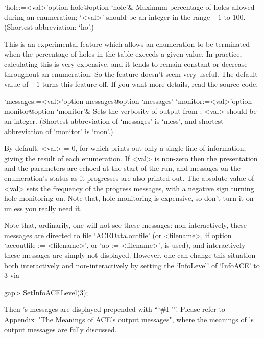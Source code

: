 \>`hole:=<val>'{option hole}@{option `hole'}&
Maximum percentage of holes allowed during an enumeration;
`<val>' should be an integer in the range $-1$ to 100.
(Shortest abbreviation: `ho'.)

This is an experimental feature which  allows  an  enumeration  to  be
terminated when the percentage of holes in the table exceeds  a  given
value. In practice, calculating this is very expensive, and  it  tends
to remain constant or  decrease  throughout  an  enumeration.  So  the
feature doesn't seem very useful. The default value of $-1$ turns this
feature off. If you want more details, read the source code.

\enditems


\beginitems

\>`messages:=<val>'{option messages}@{option `messages'}
\>`monitor:=<val>'{option monitor}@{option `monitor'}&
Sets the verbosity of output from {\ACE}; <val> should be an integer.
(Shortest  abbreviation  of  `messages'  is   `mess',   and   shortest
abbreviation of `monitor' is `mon'.)

By default, <val> = 0, for which {\ACE} prints out only a single  line
of information, giving the result of each  enumeration.  If  <val>  is
non-zero then the presentation and the parameters are  echoed  at  the
start of the run, and messages  on  the  enumeration's  status  as  it
progresses are also printed out. The absolute value of <val> sets  the
frequency of the progress messages, with a negative sign turning  hole
monitoring on. Note that, hole monitoring is expensive, so don't  turn
it on unless you really need it.

Note   that,  ordinarily,  one   will   not   see   these    messages:
non-interactively,   these   messages    are    directed    to    file
`ACEData.outfile'   (or   <filename>,   if   option   `aceoutfile   :=
<filename>', or `ao := <filename>', is used), and interactively  these
messages are simply  not  displayed.  However,  one  can  change  this
situation both interactively and   non-interactively  by  setting  the
`InfoLevel' of `InfoACE' to 3 via

\beginexample
gap> SetInfoACELevel(3);
\endexample

Then {\ACE}'s messages are  displayed  prepended  with  ```\#I  '''.
Please refer to Appendix~"The  Meanings  of  ACE's  output  messages",
where the meanings of {\ACE}'s output messages are fully discussed.

